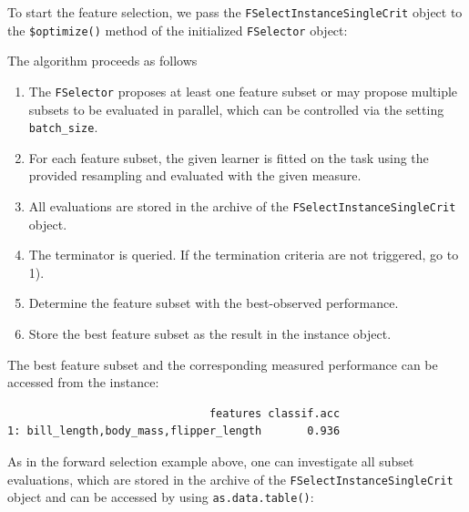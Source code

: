 To start the feature selection, we pass the
\texttt{FSelectInstanceSingleCrit} object to the \texttt{\$optimize()}
method of the initialized \texttt{FSelector} object:

\begin{Shaded}
\begin{Highlighting}[]
\SpecialCharTok{$}
\end{Highlighting}
\end{Shaded}

The algorithm proceeds as follows

\begin{enumerate}
\def\labelenumi{\arabic{enumi}.}
\tightlist
\item
  The \texttt{FSelector} proposes at least one feature subset or may
  propose multiple subsets to be evaluated in parallel, which can be
  controlled via the setting \texttt{batch\_size}.
\item
  For each feature subset, the given learner is fitted on the task using
  the provided resampling and evaluated with the given measure.
\item
  All evaluations are stored in the archive of the
  \texttt{FSelectInstanceSingleCrit} object.
\item
  The terminator is queried. If the termination criteria are not
  triggered, go to 1).
\item
  Determine the feature subset with the best-observed performance.
\item
  Store the best feature subset as the result in the instance object.
\end{enumerate}

The best feature subset and the corresponding measured performance can
be accessed from the instance:

\begin{Shaded}
\begin{Highlighting}[]
  \SpecialCharTok{$}
\end{Highlighting}
\end{Shaded}

\begin{verbatim}
                               features classif.acc
1: bill_length,body_mass,flipper_length       0.936
\end{verbatim}

As in the forward selection example above, one can investigate all
subset evaluations, which are stored in the archive of the
\texttt{FSelectInstanceSingleCrit} object and can be accessed by using
\texttt{as.data.table()}:

